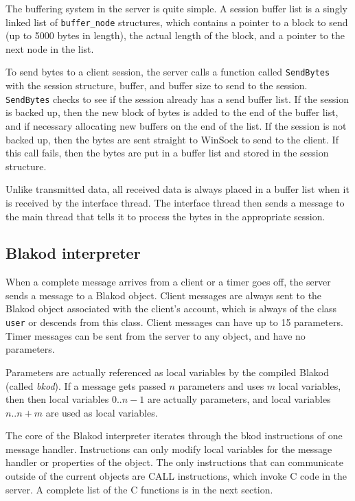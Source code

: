 The buffering system in the server is quite simple.  A session buffer list is
a singly linked list of \texttt{buffer\_node} structures, which contains a pointer
to a block to send (up to 5000 bytes in length), the actual length of the block,
and a pointer to the next node in the list.

To send bytes to a client session, the server calls a function called
\texttt{SendBytes} with the session structure, buffer, and buffer size to
send to the session.  \texttt{SendBytes} checks to see if the session already has
a send buffer list.  If the session is backed up, then the new block of bytes is
added to the end of the buffer list, and if necessary allocating new buffers on 
the end of the list.  If the session is not backed up, then the bytes are sent
straight to WinSock to send to the client.  If this call fails, then the bytes
are put in a buffer list and stored in the session structure.

Unlike transmitted data, all received data is always placed in a buffer list when
it is received by the interface thread.  The interface thread then sends a message
to the main thread that tells it to process the bytes in the appropriate session.


\subsection{Blakod interpreter}

When a complete message arrives from a client or a timer goes off, the
server sends a message to a Blakod object.  Client messages are always
sent to the Blakod object associated with the client's account, which
is always of the class \texttt{user} or descends from this class.  
Client messages can have up to 15
parameters.  Timer messages can be sent from the server to any object,
and have no parameters.

Parameters are actually referenced as local variables by the compiled
Blakod (called \emph{bkod}).  If a message gets passed $n$ parameters
and uses $m$ local variables, then then local variables $0..n-1$ are
actually parameters, and local variables $n..n+m$ are used as local
variables.

The core of the Blakod interpreter iterates through the bkod
instructions of one message handler.  Instructions can only modify
local variables for the message handler or properties of the object.
The only instructions that can communicate outside of the current
objects are CALL instructions, which invoke C code in the server.  A
complete list of the C functions is in the next section.

